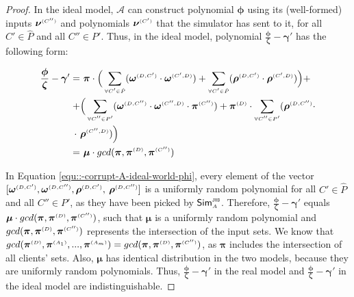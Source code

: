 \begin{proof}
In the ideal model, $\mathcal{A}$ can construct polynomial $ {\bm\phi}$ using its (well-formed) inputs $ {\bm\nu}^{ \scriptscriptstyle {  {(C'')}} }$ and polynomials $ {\bm\nu}^{ \scriptscriptstyle {  {(C')}} }$ that the simulator has sent to it, for all $C'\in\hat P$ and all $C''\in P'$. Thus, in the ideal model, polynomial $\frac{ {\bm\phi}}{\bm\zeta}-  {\bm\gamma'}$ has the following form:

\begin{equation}\label{equ::-corrupt-A-ideal-world-phi}
\begin{split}
%
\frac{ {\bm\phi}}{\bm\zeta}-  {\bm\gamma'}  = &\  { \bm\pi}\cdot\Big(\sum\limits_{\st \forall C'\in \hat P}(\bm\omega^{ \st {  {(D, C')}}} \cdot \bm\omega^{ \st {  {(C', D)}}}) + \sum\limits_{\st \forall C'\in \hat P}(\bm\rho^{ \st {  {(D, C')}}} \cdot \bm\rho^{ \st {  {(C', D)}}})\Big)+\\+ & \Big(\sum\limits_{\st \forall C''\in P'}(\bm\omega^{ \st {  {(D,C'')}}} \cdot \bm\omega^{ \st {  {(C'',D)}}}\cdot \bm\pi^{ \st {  (C'')}}) +\bm\pi^{ \st {  {(D)}}}\cdot\sum\limits_{\st \forall C''\in P'} (\bm\rho^{ \st {  {(D, C'')}}}\cdot \\ \cdot \ & \bm\rho^{ \st {  {(C'',D)}}})\Big) \\  =  &\ {\bm\mu}\cdot gcd(  {\bm\pi}, \bm\pi^{ \st {  {(D)}}}, \bm\pi^{ \st {  {(C'')}}})
 \end{split}
\end{equation}

In Equation \ref{equ::-corrupt-A-ideal-world-phi}, every element of the vector $[\bm\omega^{ \scriptscriptstyle {  {(D,C')}}}, \bm\omega^{ \scriptscriptstyle {  {(D,C'')}}}, \bm\rho^{ \scriptscriptstyle {  {(D,C')}}}, $ $\bm\rho^{ \scriptscriptstyle {  {(D,C'')}}}]$ is a uniformly random polynomial for all $C'\in\hat P$ and all $C''\in P'$, as they have been picked by $\mathsf{Sim}^{\scriptscriptstyle \mathtt{JUS}}_{\scriptscriptstyle A}$. Therefore, $\frac{ {\bm\phi}}{\bm\zeta}-  {\bm\gamma'}$ equals $ {\bm\mu}\cdot gcd(  {\bm\pi}, \bm\pi^{ \scriptscriptstyle {  {(D)}}}, \bm\pi^{ \scriptscriptstyle {  {(C'')}}})$, such that $ {\bm\mu}$ is a uniformly random polynomial and $gcd(  {\bm\pi}, \bm\pi^{ \scriptscriptstyle {  {(D)}}}, \bm\pi^{ \scriptscriptstyle {  {(C'')}}})$ represents the intersection of the input sets. We know that $gcd( \bm\pi^{ \scriptscriptstyle {  {(D)}} },\bm\pi^{\scriptscriptstyle (A_1)}, ..., \bm\pi^{\scriptscriptstyle (A_m)})=gcd(  {\bm\pi}, \bm\pi^{ \scriptscriptstyle {  {(D)}}}, \bm\pi^{ \scriptscriptstyle {  {(C'')}}})$, as $ {\bm\pi}$ includes the intersection of all clients' sets. Also, $ {\bm\mu}$ has identical distribution in the two models, because they are uniformly random polynomials. Thus,  $\frac{\bm\phi}{\bm\zeta}- \bm\gamma'$ in the real model and $\frac{ {\bm\phi}} { {\bm\zeta}}-  {\bm\gamma'}$ in the ideal model are indistinguishable.



\end{proof}
